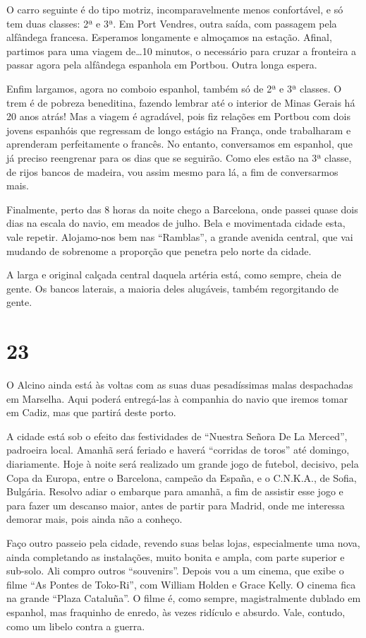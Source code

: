 O carro seguinte é do tipo motriz, incomparavelmente menos confortável, e só tem duas classes: 2ª e 3ª. Em Port Vendres, outra saída, com passagem pela alfândega francesa. Esperamos longamente e almoçamos na estação. Afinal, partimos para uma viagem de\ldots 10 minutos, o necessário para cruzar a fronteira a passar agora pela alfândega espanhola em Portbou. Outra longa espera.

Enfim largamos, agora no comboio espanhol, também só de 2ª e 3ª classes. O trem é de pobreza beneditina, fazendo lembrar até o interior de Minas Gerais há 20 anos atrás! Mas a viagem é agradável, pois fiz relações em Portbou com dois jovens espanhóis que regressam de longo estágio na França, onde trabalharam e aprenderam perfeitamente o francês. No entanto, conversamos em espanhol, que já preciso reengrenar para os dias que se seguirão. Como eles estão na 3ª classe, de rijos bancos de madeira, vou assim mesmo para lá, a fim de conversarmos mais.

Finalmente, perto das 8 horas da noite chego a Barcelona, onde passei quase dois dias na escala do navio, em meados de julho. Bela e movimentada cidade esta, vale repetir. Alojamo-nos bem nas ``Ramblas'', a grande avenida central, que vai mudando de sobrenome a proporção que penetra pelo norte da cidade.

A larga e original calçada central daquela artéria está, como sempre, cheia de gente. Os bancos laterais, a maioria deles alugáveis, também regorgitando de gente.

\section*{23 \adfflatleafright {}}
O Alcino ainda está às voltas com as suas duas pesadíssimas malas despachadas em Marselha. Aqui poderá entregá-las à companhia do navio que iremos tomar em Cadiz, mas que partirá deste porto.

A cidade está sob o efeito das festividades de ``Nuestra Señora De La Merced'', padroeira local. Amanhã será feriado e haverá ``corridas de toros'' até domingo, diariamente. Hoje à noite será realizado um grande jogo de futebol, decisivo, pela Copa da Europa, entre o Barcelona, campeão da España, e o C.N.K.A., de Sofia, Bulgária. Resolvo adiar o embarque para amanhã, a fim de assistir esse jogo e para fazer um descanso maior, antes de partir para Madrid, onde me interessa demorar mais, pois ainda não a conheço.

Faço outro passeio pela cidade, revendo suas belas lojas, especialmente uma nova, ainda completando as instalações, muito bonita e ampla, com parte superior e sub-solo. Ali compro outros ``souvenirs''. Depois vou a um cinema, que exibe o filme ``As Pontes de Toko-Ri'', com William Holden e Grace Kelly. O cinema fica na grande ``Plaza Cataluña''. O filme é, como sempre, magistralmente dublado em espanhol, mas fraquinho de enredo, às vezes ridículo e absurdo. Vale, contudo, como um libelo contra a guerra.

